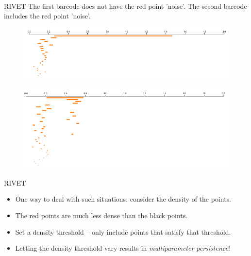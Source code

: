 \begin{frame}{RIVET}
The first barcode does not have the red point 'noise'.  The second barcode includes the red point 'noise'.

\begin{figure}
\centering
\includegraphics[scale=0.5]{images/data3rip.png}
\end{figure} 

\begin{figure}
\centering
\includegraphics[scale=0.5]{images/data7rip.png}
\end{figure} 
\end{frame}
\begin{frame}{RIVET}
\begin{itemize}
\item<1-> One way to deal with such situations: consider the density of the points.
\item<2-> The red points are much less dense than the black points.
\item<3-> Set a density threshold -- only include points that satisfy that threshold.
\item<4-> Letting the density threshold vary results in \textit{multiparameter persistence}!
\end{itemize}
\begin{figure}
\end{figure} 
\end{frame}
